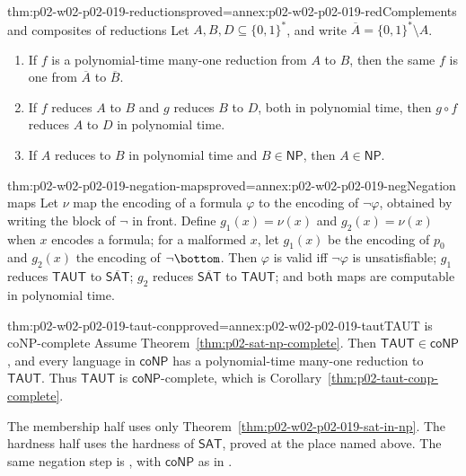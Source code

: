 \begin{hblemma}{thm:p02-w02-p02-019-reductions}{proved=annex:p02-w02-p02-019-red}{Complements and composites of reductions}
Let \(A,B,D\subseteq\{0,1\}^*\), and write \(\overline A=\{0,1\}^*\setminus A\).
\begin{enumerate}
  \item If \(f\) is a polynomial-time many-one reduction from \(A\) to \(B\),
        then the same \(f\) is one from \(\overline A\) to \(\overline B\).
  \item If \(f\) reduces \(A\) to \(B\) and \(g\) reduces \(B\) to \(D\), both
        in polynomial time, then \(g\circ f\) reduces \(A\) to \(D\) in
        polynomial time.
  \item If \(A\) reduces to \(B\) in polynomial time and
        \(B\in\mathsf{NP}\), then \(A\in\mathsf{NP}\).
\end{enumerate}
\end{hblemma}

\begin{hblemma}{thm:p02-w02-p02-019-negation-maps}{proved=annex:p02-w02-p02-019-neg}{Negation maps}
Let \(\nu\) map the encoding of a formula \(\varphi\) to the encoding of
\(\neg\varphi\), obtained by writing the block of \(\neg\) in front.  Define
\(g_1(x)=\nu(x)\) and \(g_2(x)=\nu(x)\) when \(x\) encodes a formula; for a
malformed \(x\), let \(g_1(x)\) be the encoding of \(p_0\) and \(g_2(x)\) the
encoding of \(\neg\bottom\).  Then \(\varphi\) is valid iff \(\neg\varphi\) is
unsatisfiable; \(g_1\) reduces \(\mathsf{TAUT}\) to
\(\overline{\mathsf{SAT}}\); \(g_2\) reduces \(\overline{\mathsf{SAT}}\) to
\(\mathsf{TAUT}\); and both maps are computable in polynomial time.
\end{hblemma}

\begin{hbtheorem}{thm:p02-w02-p02-019-taut-conp}{proved=annex:p02-w02-p02-019-taut}{TAUT is coNP-complete}
Assume Theorem~\ref{thm:p02-sat-np-complete}.  Then \(\mathsf{TAUT}\in\mathsf{coNP}\),
and every language in \(\mathsf{coNP}\) has a polynomial-time many-one
reduction to \(\mathsf{TAUT}\).  Thus \(\mathsf{TAUT}\) is
\(\mathsf{coNP}\)-complete, which is
Corollary~\ref{thm:p02-taut-conp-complete}.
\end{hbtheorem}

The membership half uses only
Theorem~\ref{thm:p02-w02-p02-019-sat-in-np}.  The hardness half uses the
hardness of \(\mathsf{SAT}\), proved at the place named above.  The same
negation step is \cite[ex.~2.23]{AroraBarak2009}, with \(\mathsf{coNP}\) as in
\cite[def.~2.21, def.~2.22]{AroraBarak2009}.

